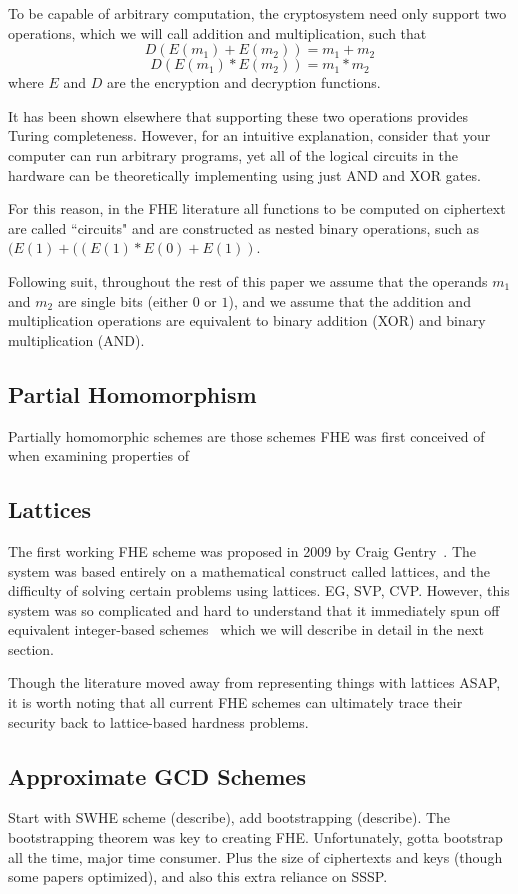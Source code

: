 \documentclass[letterpaper,twocolumn,10pt]{article}
\begin{document}
To be capable of arbitrary computation, the cryptosystem need only support two operations, which we will call addition and multiplication, such that
$$D(E(m_1) + E(m_2)) = m_1 + m_2$$
$$D(E(m_1) * E(m_2)) = m_1 * m_2$$
where $E$ and $D$ are the encryption and decryption functions.

It has been shown elsewhere that supporting these two operations provides Turing completeness. However, for an intuitive explanation, consider that your computer can run arbitrary programs, yet all of the logical circuits in the hardware can be theoretically implementing using just AND and XOR gates. 

For this reason, in the FHE literature all functions to be computed on ciphertext are called ``circuits" and are constructed as nested binary operations, such as $(E(1)+((E(1)*E(0)+E(1))$.

Following suit, throughout the rest of this paper we assume that the operands $m_1$ and $m_2$ are single bits (either $0$ or $1$), and we assume that the addition and multiplication operations are equivalent to binary addition (XOR) and binary multiplication (AND).

\subsection{Partial Homomorphism}
Partially homomorphic schemes are those schemes FHE was first conceived of when examining properties of  

\subsection{Lattices}
The first working FHE scheme was proposed in 2009 by Craig Gentry~\cite{GentryThesis09, GentrySTOC09}. The system was based entirely on a mathematical construct called lattices, and the difficulty of solving certain problems using lattices. EG, SVP, CVP. However, this system was so complicated and hard to understand that it immediately spun off equivalent integer-based schemes~\cite{SmartVercauteren, DGHV} which we will describe in detail in the next section.

Though the literature moved away from representing things with lattices ASAP, it is worth noting that all current FHE schemes can ultimately trace their security back to lattice-based hardness problems. 

\subsection{Approximate GCD Schemes}
Start with SWHE scheme (describe), add bootstrapping (describe).
The bootstrapping theorem was key to creating FHE. Unfortunately, gotta bootstrap all the time, major time consumer. Plus the size of ciphertexts and keys (though some papers optimized), and also this extra reliance on SSSP.
\end{document}
